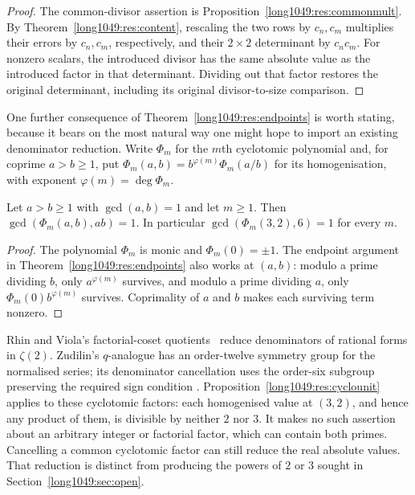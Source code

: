 \documentclass[11pt]{article}
\begin{document}
\begin{proof}
The common-divisor assertion is Proposition~\ref{long1049:res:commonmult}.
By Theorem~\ref{long1049:res:content}, rescaling the two rows by
$c_n,c_m$ multiplies their errors by $c_n,c_m$, respectively, and
their $2\times2$ determinant by $c_nc_m$. For nonzero scalars, the
introduced divisor has the same absolute value as the introduced
factor in that determinant. Dividing out that factor restores the
original determinant, including its original divisor-to-size comparison.
\end{proof}

One further consequence of Theorem~\ref{long1049:res:endpoints} is worth stating,
because it bears on the most natural way one might hope to import an existing
denominator reduction.  Write $\Phi_m$ for the $m$th cyclotomic polynomial and,
for coprime $a>b\ge1$, put $\Phi_m(a,b)=b^{\varphi(m)}\Phi_m(a/b)$ for its
homogenisation, with exponent $\varphi(m)=\deg\Phi_m$.

\begin{proposition}
\label{long1049:res:cyclounit}
Let $a>b\ge1$ with $\gcd(a,b)=1$ and let $m\ge1$.  Then
$\gcd(\Phi_m(a,b),ab)=1$.  In particular $\gcd(\Phi_m(3,2),6)=1$ for every $m$.
\end{proposition}

\begin{proof}
The polynomial $\Phi_m$ is monic and $\Phi_m(0)=\pm1$. The endpoint
argument in Theorem~\ref{long1049:res:endpoints} also works at $(a,b)$:
modulo a prime dividing $b$, only $a^{\varphi(m)}$ survives, and
modulo a prime dividing $a$, only $\Phi_m(0)b^{\varphi(m)}$ survives.
Coprimality of $a$ and $b$ makes each surviving term nonzero.
\end{proof}

Rhin and Viola's factorial-coset quotients~\cite{rhinviola1996}
reduce denominators of rational forms in $\zeta(2)$. Zudilin's
$q$-analogue has an order-twelve symmetry group for the normalised
series; its denominator cancellation uses the order-six subgroup
preserving the required sign condition
\cite[Sec.~4, pp.~159--161]{zudilin2004}.
Proposition~\ref{long1049:res:cyclounit} applies to these cyclotomic
factors: each homogenised value at $(3,2)$, and hence any product of
them, is divisible by neither $2$ nor $3$. It makes no such assertion
about an arbitrary integer or factorial factor, which can contain
both primes. Cancelling a common cyclotomic factor can still reduce
the real absolute values. That reduction is distinct from producing
the powers of $2$ or $3$ sought in Section~\ref{long1049:sec:open}.
\end{document}
